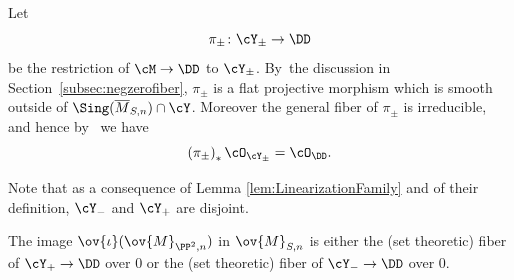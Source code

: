 Let
\begin{equation}\label{eq:FixedFamilyFlat}
\pi_{\pm}\colon \cY_{\pm} \to \DD
\end{equation}
be the restriction of $\cM\to\DD$ to $\cY_{\pm}$. By~the discussion in Section~\ref{subsec:negzerofiber}, $\pi_{\pm}$ is a flat projective morphism which is smooth outside of $\Sing(\overline{M}_{S,n})\cap \cY$.
Moreover the general fiber of $\pi_{\pm}$ is irreducible, and hence by~ we have
\begin{equation}\label{pushstruct}
\left(\pi_{\pm}\right)_*\cO_{\cY_{\pm}}=\cO_{\DD}.
\end{equation}

Note that as a consequence of Lemma \ref{lem:LinearizationFamily} and of their definition, $\cY_-$ and $\cY_+$ are disjoint.

\begin{lemm}\label{lem:tuttasola}
The image $\ov{\iota}(\ov{M}_{\PP^2,n})$ in $\ov{M}_{S,n}$ is either the (set theoretic) fiber of \hbox{$\cY_+\to \DD$} over $0$ or the (set theoretic) fiber of $\cY_-\to \DD$ over $0$.
\end{lemm}

